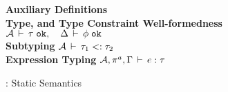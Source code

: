 \begin{figure*}[t!]
%
\textbf{Auxiliary Definitions}\\

%

\vspace*{0.1in}
%
\textbf{Type, and Type Constraint Well-formedness}  \; \fbox
  {\({\mathcal{A}}\,\vdash\,\tau \; \texttt{ok}, \quad 
     \Delta\,\vdash\,\phi \; \texttt{ok}\)}\\


\vspace*{0.1in}
%
\textbf{Subtyping}  \; \fbox
  {\({\mathcal{A}}\,\vdash\,\tau_1 <: \tau_2\)}\\

%

\vspace*{0.1in}
\textbf{Expression Typing}  \; \fbox
  {\({\mathcal{A}},\pi^a,\Gamma\,\vdash\,e:\tau\)}\\

%

\caption{\fbname: Static Semantics}
\label{fig:fb-staticsem}
\end{figure*}


